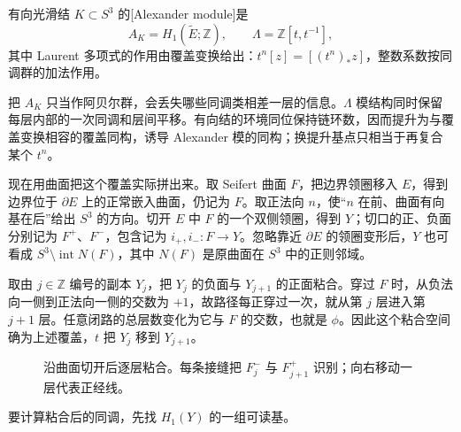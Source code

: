 \begin{definition}\label{g2:def:alexander-module}
	有向光滑结 \(K\subset S^3\) 的[Alexander module]是
	\[
		A_K=H_1(\widetilde E;\mathbb Z),\qquad
		\Lambda=\mathbb Z[t,t^{-1}],
	\]
	其中 Laurent 多项式的作用由覆盖变换给出：\(t^n[z]=[(t^n)_*z]\)，整数系数按同调群的加法作用。
\end{definition}

把 \(A_K\) 只当作阿贝尔群，会丢失哪些同调类相差一层的信息。\(\Lambda\) 模结构同时保留每层内部的一次同调和层间平移。有向结的环境同位保持链环数，因而提升为与覆盖变换相容的覆盖同构，诱导 Alexander 模的同构；换提升基点只相当于再复合某个 \(t^n\)。

\ProseParagraphBreak

现在用曲面把这个覆盖实际拼出来。取 Seifert 曲面 \(F\)，把边界领圈移入 \(E\)，得到边界位于 \(\partial E\) 上的正常嵌入曲面，仍记为 \(F\)。取正法向 \(n\)，使“\(n\) 在前、曲面有向基在后”给出 \(S^3\) 的方向。切开 \(E\) 中 \(F\) 的一个双侧领圈，得到 \(Y\)；切口的正、负面分别记为 \(F^+\)、\(F^-\)，包含记为 \(i_+,i_-:F\to Y\)。忽略靠近 \(\partial E\) 的领圈变形后，\(Y\) 也可看成 \(S^3\setminus\operatorname{int}N(F)\)，其中 \(N(F)\) 是原曲面在 \(S^3\) 中的正则邻域。

取由 \(j\in\mathbb Z\) 编号的副本 \(Y_j\)，把 \(Y_j\) 的负面与 \(Y_{j+1}\) 的正面粘合。穿过 \(F\) 时，从负法向一侧到正法向一侧的交数为 \(+1\)，故路径每正穿过一次，就从第 \(j\) 层进入第 \(j+1\) 层。任意闭路的总层数变化为它与 \(F\) 的交数，也就是 \(\phi\)。因此这个粘合空间确为上述覆盖，\(t\) 把 \(Y_j\) 移到 \(Y_{j+1}\)。
\begin{figure}[htbp]
	\centering
	
	\caption{沿曲面切开后逐层粘合。每条接缝把 \(F^-_j\) 与 \(F^+_{j+1}\) 识别；向右移动一层代表正经线。}
	\label{g2:fig:seifert-cover}
\end{figure}

要计算粘合后的同调，先找 \(H_1(Y)\) 的一组可读基。

